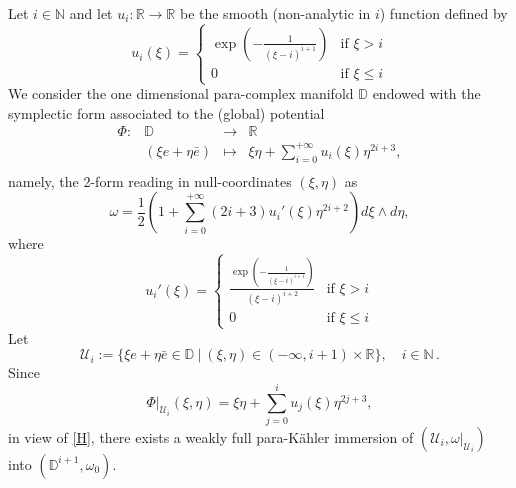 \documentclass{article}
\newcommand{\R}{\mathds{R}}
\newcommand{\pk}{para-K\"ahler }
\newcommand{\N}{\mathds{N}}
\newcommand{\D}{\mathds{D}}
\begin{document}
Let $i\in \N$ and let $u_i:\R\to\R$ be the smooth (non-analytic in $i$) function defined by
\begin{equation}
u_i(\xi)=\begin{cases}
\exp\left( -\frac{1}{(\xi-i)^{i+1}}\right) & \text{if } \xi> i\\
0 & \text{if } \xi\leq i
\end{cases}
\end{equation}
We consider the one dimensional para-complex manifold $\D$ endowed with the symplectic form associated to the (global) potential
\begin{equation}\begin{array}{rccl}
\Phi:&\D&\longrightarrow&\R\\
&(\xi e+\eta \bar e)&\longmapsto& \xi \eta+\sum_{i=0}^{+\infty} u_i(\xi) \eta^{2i+3},\\
\end{array}
\end{equation}
namely, the 2-form reading in null-coordinates $(\xi,\eta)$ as
$$\omega=\frac{1}{2}\left(1 +\sum_{i=0}^{+\infty} (2i+3)u_i'(\xi) \eta^{2i+2}\right) d\xi\wedge d\eta,$$
where
$$u_i'(\xi)=\begin{cases}
\frac{\exp\left( -\frac{1}{(\xi-i)^{i+1}}\right)}{(\xi-i)^{i+2}} & \text{if } \xi> i\\
0 & \text{if } \xi\leq i
\end{cases}$$
Let
$$\mathcal{U}_i:=\{\xi e+\eta \bar e\in \D\ |\  (\xi,\eta)\in\left(-\infty, i+1 \right)\times \R\}, \quad i\in\N\,.$$
Since 
$$\Phi\big|_{\mathcal{U}_i}(\xi,\eta)= \xi \eta+\sum_{j=0}^{i} u_j(\xi) \eta^{2j+3}, $$ 
in view of \eqref{H}, there exists   a weakly full \pk immersion of $\left(\mathcal{U}_i,\omega\big|_{\mathcal{U}_i}\right)$ into $(\D^{i+1},\omega_0)$. \\
\end{document}
